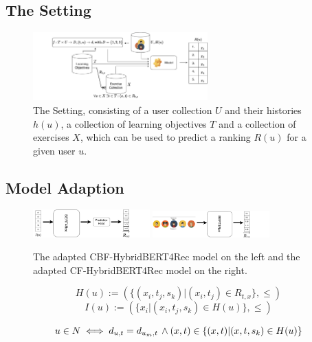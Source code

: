\documentclass{Academic}
\begin{document}
        \subsection{The Setting}
    \begin{figure}[ht!]
        \centering
        \includegraphics[width=0.6\textwidth]{images/setting.pdf}
        \caption{The Setting, consisting of a user collection $U$ and their histories $h(u)$, a collection of learning objectives $T$ and a collection of exercises $X$, which can be used to predict a ranking $R(u)$ for a given user $u$.}
        \label{fig:setting}
    \end{figure}

    \subsection{Model Adaption}
    \begin{figure}[ht!]
        \centering
        \includegraphics[width=0.4\textwidth]{images/cbf.pdf}
        \includegraphics[width=0.4\textwidth]{images/CF_use_case.pdf}
        \caption{The adapted CBF-HybridBERT4Rec model on the left and the adapted CF-HybridBERT4Rec model on the right.}
        \label{fig:modelAdapt}
    \end{figure}

    \begin{equation}
        H(u) := (\{(x_i, t_j, s_k)| (x_i, t_j) \in R_{t,x}\}, \leq)
    \end{equation}
    \begin{equation}
        I(u) := (\{x_i|(x_i, t_j, s_k) \in H(u)\}, \leq)
    \end{equation}

    \begin{equation}
        u \in N \iff d_{u, t} = d_{u_m, t} \text{\,} \wedge (x, t) \in \{(x,t)|(x,t,s_k) \in H(u)\}
    \end{equation}
\end{document}
